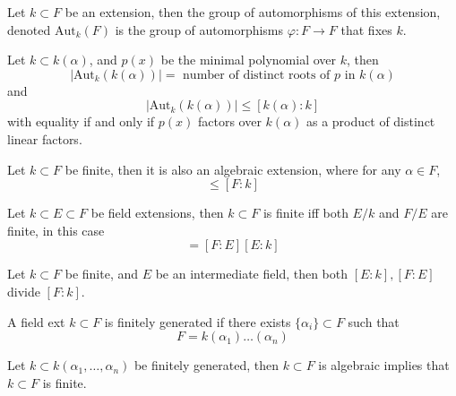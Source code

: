\documentclass[openany]{book}
\begin{document}
\begin{defn}
    Let $k\subset F$ be an extension, then the group of automorphisms of this extension, denoted $\text{Aut}_k(F)$ is the group of automorphisms $\varphi:F\to F$ that fixes $k$.
\end{defn}

\begin{cor}
    Let $k\subset k(\alpha)$, and $p(x)$ be the minimal polynomial over $k$, then 
    \begin{equation*}
        |\text{Aut}_k(k(\alpha))|=\text{ number of distinct roots of $p$ in $k(\alpha)$}
    \end{equation*}
    and 
    \begin{equation*}
        |\text{Aut}_k(k(\alpha))|\leq [k(\alpha):k]
    \end{equation*}
    with equality if and only if $p(x)$ factors over $k(\alpha)$ as a product of distinct linear factors.
\end{cor}


\begin{prop}
    Let $k\subset F$ be finite, then it is also an algebraic extension, where for any $\alpha\in F$, 
    \begin{equation*}
        [k(\alpha):k]\leq [F: k]
    \end{equation*}
\end{prop}



\begin{prop}
    Let $k\subset E\subset F$ be field extensions, then $k\subset F$ is finite iff both $E/k$ and $F/E$ are finite, in this case 
    \begin{equation*}
        [F:k]=[F:E][E:k]
    \end{equation*}
\end{prop}


\begin{cor}
    Let $k\subset F$ be finite, and $E$ be an intermediate field, then both $[E:k],[F:E]$ divide $[F:k]$.
\end{cor}

\begin{defn}
    A field ext $k\subset F$  is finitely generated if there exists $\{\alpha_i\}\subset F$ such that 
    \begin{equation*}
        F=k(\alpha_1)\dots(\alpha_n)
    \end{equation*}
\end{defn}


\begin{prop}
    Let $k\subset k(\alpha_1,\dots,\alpha_n)$ be finitely generated, then
    $k\subset F$ is algebraic implies that $k\subset F$ is finite.
\end{prop}
\end{document}
